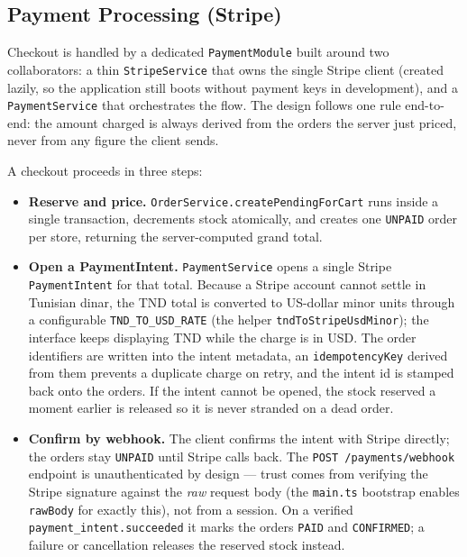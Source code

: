 \documentclass[12pt, a4paper, oneside]{report}
\begin{document}
\subsection{Payment Processing (Stripe)}
\label{sec:backend-payments}

Checkout is handled by a dedicated \texttt{PaymentModule} built around
two collaborators: a thin \texttt{StripeService} that owns the single
Stripe client (created lazily, so the application still boots without
payment keys in development), and a \texttt{PaymentService} that
orchestrates the flow. The design follows one rule end-to-end: the
amount charged is always derived from the orders the server just
priced, never from any figure the client sends.

A checkout proceeds in three steps:

\begin{itemize}[leftmargin=*,itemsep=2pt]
  \item \textbf{Reserve and price.}
        \texttt{OrderService.createPendingForCart} runs inside a single
        transaction, decrements stock atomically, and creates one
        \texttt{UNPAID} order per store, returning the server-computed
        grand total.
  \item \textbf{Open a PaymentIntent.} \texttt{PaymentService} opens a
        single Stripe \texttt{PaymentIntent} for that total. Because a
        Stripe account cannot settle in Tunisian dinar, the TND total
        is converted to US-dollar minor units through a configurable
        \texttt{TND\_TO\_USD\_RATE} (the helper
        \texttt{tndToStripeUsdMinor}); the interface keeps displaying
        TND while the charge is in USD. The order identifiers are
        written into the intent metadata, an \texttt{idempotencyKey}
        derived from them prevents a duplicate charge on retry, and the
        intent id is stamped back onto the orders. If the intent cannot
        be opened, the stock reserved a moment earlier is released so it
        is never stranded on a dead order.
  \item \textbf{Confirm by webhook.} The client confirms the intent
        with Stripe directly; the orders stay \texttt{UNPAID} until
        Stripe calls back. The \texttt{POST /payments/webhook} endpoint
        is unauthenticated by design --- trust comes from verifying the
        Stripe signature against the \emph{raw} request body (the
        \texttt{main.ts} bootstrap enables \texttt{rawBody} for exactly
        this), not from a session. On a verified
        \texttt{payment\_intent.succeeded} it marks the orders
        \texttt{PAID} and \texttt{CONFIRMED}; a failure or cancellation
        releases the reserved stock instead.
\end{itemize}
\end{document}
